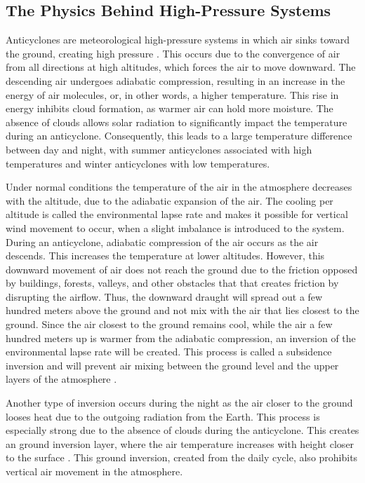 \subsection{The Physics Behind High-Pressure Systems}
Anticyclones are meteorological high-pressure systems in which air sinks toward the ground, creating high pressure \cite{spiridonovCyclonesAnticyclonesSpringerLink2020}. This occurs due to the convergence of air from all directions at high altitudes, which forces the air to move downward. The descending air undergoes adiabatic compression, resulting in an increase in the energy of air molecules, or, in other words, a higher temperature. This rise in energy inhibits cloud formation, as warmer air can hold more moisture. The absence of clouds allows solar radiation to significantly impact the temperature during an anticyclone. Consequently, this leads to a large temperature difference between day and night, with summer anticyclones associated with high temperatures and winter anticyclones with low temperatures. 

Under normal conditions the temperature of the air in the atmosphere decreases with the altitude, due to the adiabatic expansion of the air. The cooling per altitude is called the environmental lapse rate and makes it possible for vertical wind movement to occur, when a slight imbalance is introduced to the system. During an anticyclone, adiabatic compression of the air occurs as the air descends. This increases the temperature at lower altitudes. However, this downward movement of air does not reach the ground due to the friction opposed by buildings, forests, valleys, and other obstacles that that creates friction by disrupting the airflow. Thus, the downward draught will spread out a few hundred meters above the ground and not mix with the air that lies closest to the ground. Since the air closest to the ground remains cool, while the air a few hundred meters up is warmer from the adiabatic compression, an inversion of the environmental lapse rate will be created. This process is called a subsidence inversion and will prevent air mixing between the ground level and the upper layers of the atmosphere \cite{gramschInfluenceSurfaceSubsidence2014}.


 Another type of inversion occurs during the night as the air closer to the ground looses heat due to the outgoing radiation from the Earth. This process is especially strong due to the absence of clouds during the anticyclone. This creates an ground inversion layer, where the air temperature increases with height closer to the surface \cite{gregohareWeatherClimateClimate2005}. This ground inversion, created from the daily cycle, also prohibits vertical air movement in the atmosphere.


